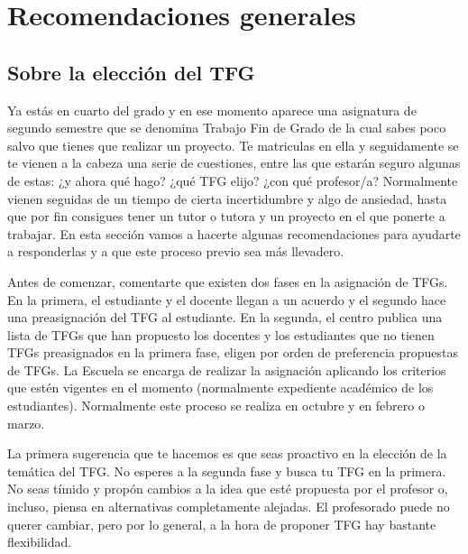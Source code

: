 \chapter{Recomendaciones generales}
\label{cap:Recomendaciones}


\section{Sobre la elección del TFG}


Ya estás en cuarto del grado y en ese momento aparece una asignatura de segundo semestre que se denomina Trabajo Fin de Grado de la cual sabes poco salvo que tienes que realizar un proyecto. Te matriculas en ella y seguidamente se te vienen a la cabeza una serie de cuestiones, entre las que estarán seguro algunas de estas: ¿y ahora qué hago? ¿qué TFG elijo? ¿con qué profesor/a? Normalmente vienen seguidas de un tiempo de cierta incertidumbre y algo de ansiedad, hasta que por fin consigues tener un tutor o tutora y un proyecto en el que ponerte a trabajar. En esta sección vamos a hacerte algunas recomendaciones para ayudarte a responderlas y a que este proceso previo sea más llevadero.

Antes de comenzar, comentarte que existen dos fases en la asignación de TFGs. En la primera, el estudiante y el docente llegan a un acuerdo y el segundo hace una preasignación del TFG al estudiante. En la segunda, el centro publica una lista de TFGs que han propuesto los docentes y los estudiantes que no tienen TFGs preasignados en la primera fase, eligen por orden de preferencia propuestas de TFGs. La Escuela se encarga de realizar la asignación aplicando los criterios que estén vigentes en el momento (normalmente expediente académico de los estudiantes). Normalmente este proceso se realiza en octubre y en febrero o marzo.

La primera sugerencia que te hacemos es que seas proactivo en la elección de la temática del TFG. No esperes a la segunda fase y busca tu TFG en la primera. No seas tímido y propón cambios a la idea que esté propuesta por el profesor o, incluso, piensa en alternativas completamente alejadas. El profesorado puede no querer cambiar, pero por lo general, a la hora de proponer TFG hay bastante flexibilidad.

